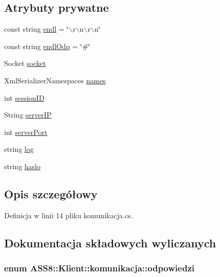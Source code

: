 \subsection*{Atrybuty prywatne}
\begin{CompactItemize}
\item 
const string \hyperlink{a00013_2c01e8a98bfa8f0404b94af607eacbba}{endl} = \char`\"{}$\backslash$r$\backslash$n$\backslash$r$\backslash$n\char`\"{}
\item 
const string \hyperlink{a00013_50e87371e5422a5bc0cb7b81a917e569}{endlOdp} = \char`\"{}\#\char`\"{}
\item 
Socket \hyperlink{a00013_d521d29af9bd410a982fb72814ae1eb0}{socket}
\item 
XmlSerializerNamespaces \hyperlink{a00013_fad59850af421f7d3a2ad72f29fabe3d}{names}
\item 
int \hyperlink{a00013_b992298af41161b42d77dbf23dfccad8}{sessionID}
\item 
String \hyperlink{a00013_596f53c293d3811c950901c69c30aee4}{serverIP}
\item 
int \hyperlink{a00013_6b37a2dd270fa5483aad7080a7ff71d4}{serverPort}
\item 
string \hyperlink{a00013_4b00947de0ccf2197483dd77d35538f5}{log}
\item 
string \hyperlink{a00013_3003b01b9def7b324ad146f5598b00f1}{haslo}
\end{CompactItemize}


\subsection{Opis szczegółowy}


Definicja w linii 14 pliku komunikacja.cs.

\subsection{Dokumentacja składowych wyliczanych}
\hypertarget{a00013_269bf72dbaab617daf62394689014af9}{
\subsubsection[{odpowiedzi}]{\setlength{\rightskip}{0pt plus 5cm}enum {\bf ASS8::Klient::komunikacja::odpowiedzi}}}
\label{d7/dd4/a00013_269bf72dbaab617daf62394689014af9}


